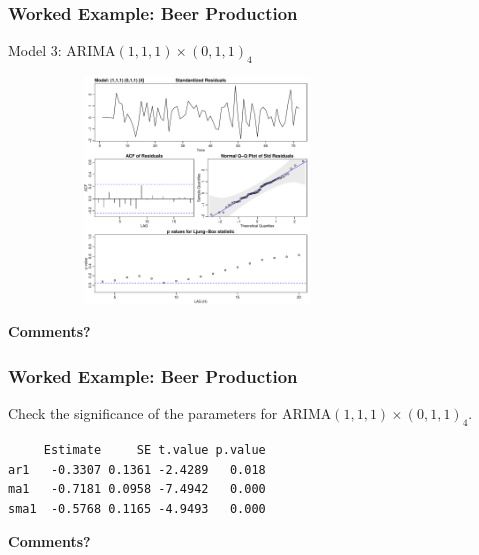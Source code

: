 \documentclass[%
xcolor=pdftex]{beamer}
\begin{document}
\begin{frame}
\frametitle{Worked Example: Beer Production}

Model 3: ARIMA$(1,1,1) \times (0,1,1)_4$

\includegraphics[width=100mm, height=60mm]{beer_m3.pdf}

\textbf{Comments?}
\end{frame}

\begin{frame}[fragile]
\frametitle{Worked Example: Beer Production}

Check the significance of the parameters for ARIMA$(1,1,1) \times (0,1,1)_4$.

\begin{verbatim}
     Estimate     SE t.value p.value
ar1   -0.3307 0.1361 -2.4289   0.018
ma1   -0.7181 0.0958 -7.4942   0.000
sma1  -0.5768 0.1165 -4.9493   0.000
\end{verbatim}

\textbf{Comments?}
\end{frame}
\end{document}

